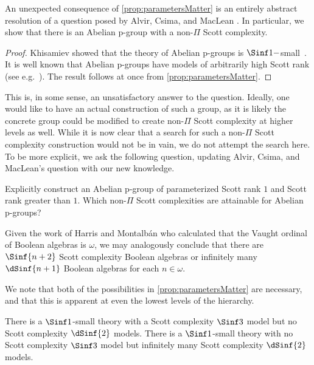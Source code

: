 \documentclass{amsart}
\renewcommand{\-}{\text{-}}
\begin{document}
An unexpected consequence of \cref{prop:parametersMatter} is an entirely abstract resolution of a question posed by Alvir, Csima, and MacLean \cite[Question 5.2]{ACM24}.
In particular, we show that there is an Abelian p-group with a non-$\Pi$ Scott complexity.

\abelianpsigma


\begin{proof}
Khisamiev showed that the theory of Abelian p-groups is $\Sinf1-$small~\cite{Khi04}.
It is well known that Abelian p-groups have models of arbitrarily high Scott rank (see e.g.~\cite{ACM24}).
The result follows at once from \cref{prop:parametersMatter}.
\end{proof}

This is, in some sense, an unsatisfactory answer to the question.
Ideally, one would like to have an actual construction of such a group, as it is likely the concrete group could be modified to create non-$\Pi$ Scott complexity at higher levels as well.
While it is now clear that a search for such a non-$\Pi$ Scott complexity construction would not be in vain, we do not attempt the search here.
To be more explicit, we ask the following question, updating Alvir, Csima, and MacLean's question with our new knowledge.

\begin{question}
  Explicitly construct an Abelian p-group of parameterized Scott rank $1$ and Scott rank greater than $1$. Which non-$\Pi$ Scott complexities are attainable for Abelian p-groups?
\end{question}

Given the work of Harris and Montalbán \cite{HM} who calculated that the Vaught ordinal of Boolean algebras is $\omega$, we may analogously conclude that there are $\Sinf{n+2}$ Scott complexity Boolean algebras or infinitely many $\dSinf{n+1}$ Boolean algebras for each $n\in\omega$.

We note that both of the possibilities in \cref{prop:parametersMatter} are necessary, and that this is apparent at even the lowest levels of the hierarchy.
\begin{proposition}
There is a $\Sinf1$-small theory with a Scott complexity $\Sinf3$ model but no Scott complexity $\dSinf{2}$ models.
There is a $\Sinf1$-small theory with no Scott complexity $\Sinf3$ model but infinitely many Scott complexity $\dSinf{2}$ models.
\end{proposition}
\end{document}
